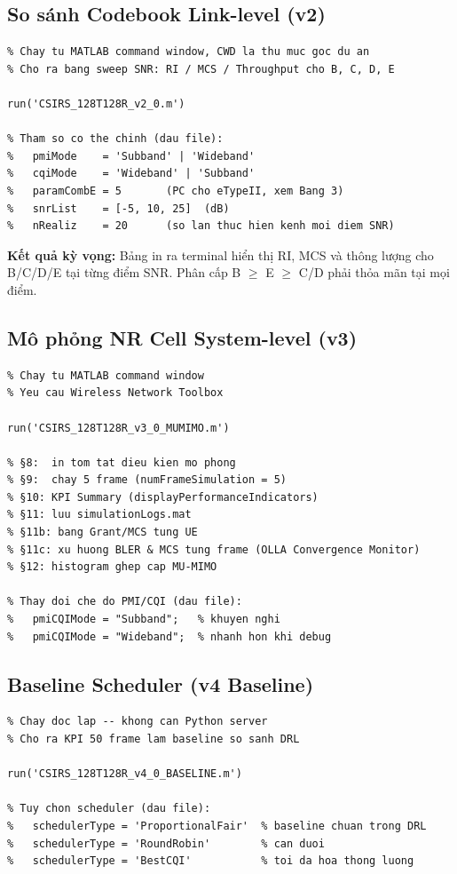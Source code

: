 \documentclass[12pt, a4paper]{article}
\begin{document}
\subsection{So sánh Codebook Link-level (v2)}

\begin{lstlisting}
% Chay tu MATLAB command window, CWD la thu muc goc du an
% Cho ra bang sweep SNR: RI / MCS / Throughput cho B, C, D, E

run('CSIRS_128T128R_v2_0.m')

% Tham so co the chinh (dau file):
%   pmiMode    = 'Subband' | 'Wideband'
%   cqiMode    = 'Wideband' | 'Subband'
%   paramCombE = 5       (PC cho eTypeII, xem Bang 3)
%   snrList    = [-5, 10, 25]  (dB)
%   nRealiz    = 20      (so lan thuc hien kenh moi diem SNR)
\end{lstlisting}

\textbf{Kết quả kỳ vọng:} Bảng in ra terminal hiển thị RI, MCS và
thông lượng cho B/C/D/E tại từng điểm SNR. Phân cấp
B $\geq$ E $\geq$ C/D phải thỏa mãn tại mọi điểm.

\subsection{Mô phỏng NR Cell System-level (v3)}

\begin{lstlisting}
% Chay tu MATLAB command window
% Yeu cau Wireless Network Toolbox

run('CSIRS_128T128R_v3_0_MUMIMO.m')

% §8:  in tom tat dieu kien mo phong
% §9:  chay 5 frame (numFrameSimulation = 5)
% §10: KPI Summary (displayPerformanceIndicators)
% §11: luu simulationLogs.mat
% §11b: bang Grant/MCS tung UE
% §11c: xu huong BLER & MCS tung frame (OLLA Convergence Monitor)
% §12: histogram ghep cap MU-MIMO

% Thay doi che do PMI/CQI (dau file):
%   pmiCQIMode = "Subband";   % khuyen nghi
%   pmiCQIMode = "Wideband";  % nhanh hon khi debug
\end{lstlisting}

\subsection{Baseline Scheduler (v4 Baseline)}

\begin{lstlisting}
% Chay doc lap -- khong can Python server
% Cho ra KPI 50 frame lam baseline so sanh DRL

run('CSIRS_128T128R_v4_0_BASELINE.m')

% Tuy chon scheduler (dau file):
%   schedulerType = 'ProportionalFair'  % baseline chuan trong DRL
%   schedulerType = 'RoundRobin'        % can duoi
%   schedulerType = 'BestCQI'           % toi da hoa thong luong
\end{lstlisting}
\end{document}
